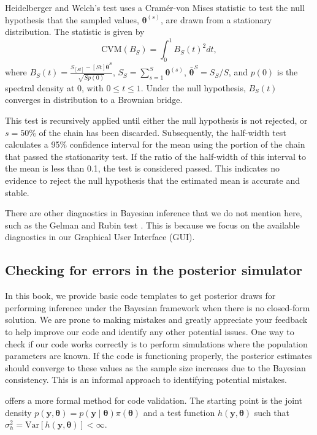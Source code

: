 Heidelberger and Welch's test \cite{Heidelberger1983} uses a Cramér-von Mises statistic to test the null hypothesis that the sampled values, $\bm{\theta}^{(s)}$, are drawn from a stationary distribution. The statistic is given by 
\[
\text{CVM}(B_S) = \int_0^1 B_S(t)^2 dt,
\]
where $B_S(t) = \frac{S_{\left[St\right]} - \left[St\right] \bar{\bm{\theta}}^S}{\sqrt{S p(0)}}$, $S_S = \sum_{s=1}^S \bm{\theta}^{(s)}$, $\bar{\bm{\theta}}^S = S_S / S$, and $p(0)$ is the spectral density at 0, with $0 \leq t \leq 1$. Under the null hypothesis, $B_S(t)$ converges in distribution to a Brownian bridge.

This test is recursively applied until either the null hypothesis is not rejected, or $s = 50\%$ of the chain has been discarded. Subsequently, the half-width test calculates a 95\% confidence interval for the mean using the portion of the chain that passed the stationarity test. If the ratio of the half-width of this interval to the mean is less than 0.1, the test is considered passed. This indicates no evidence to reject the null hypothesis that the estimated mean is accurate and stable.

There are other diagnostics in Bayesian inference that we do not mention here, such as the Gelman and Rubin test \cite{Gelman1992}. This is because we focus on the available diagnostics in our Graphical User Interface (GUI).

\subsection{Checking for errors in the posterior simulator}

In this book, we provide basic code templates to get posterior draws for performing inference under the Bayesian framework when there is no closed-form solution. We are prone to making mistakes and greatly appreciate your feedback to help improve our code and identify any other potential issues. One way to check if our code works correctly is to perform simulations where the population parameters are known. If the code is functioning properly, the posterior estimates should converge to these values as the sample size increases due to the Bayesian consistency. This is an informal approach to identifying potential mistakes.

\cite{geweke2004getting} offers a more formal method for code validation. The starting point is the joint density $p(\bm{y},\bm{\theta})=p(\bm{y}\mid \bm{\theta})\pi(\bm{\theta})$ and a test function $h(\bm{y},\bm{\theta})$ such that $\sigma_h^2=\text{Var}[h(\bm{y},\bm{\theta})]<\infty$.

